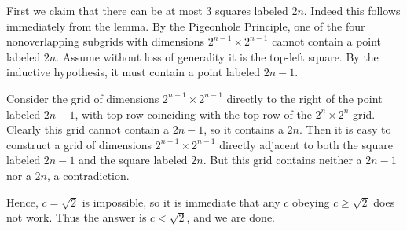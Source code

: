 First we claim that there can be at most $3$ squares labeled $2n$. Indeed this follows immediately from the lemma. By the Pigeonhole Principle, one of the four nonoverlapping subgrids with dimensions $2^{n-1}\times2^{n-1}$ cannot contain a point labeled $2n$. Assume without loss of generality it is the top-left square. By the inductive hypothesis, it must contain a point labeled $2n-1$.

Consider the grid of dimensions $2^{n-1}\times2^{n-1}$ directly to the right of the point labeled $2n-1$, with top row coinciding with the top row of the $2^n\times2^n$ grid. Clearly this grid cannot contain a $2n-1$, so it contains a $2n$. Then it is easy to construct a grid of dimensions $2^{n-1}\times2^{n-1}$ directly adjacent to both the square labeled $2n-1$ and the square labeled $2n$. But this grid contains neither a $2n-1$ nor a $2n$, a contradiction.

Hence, $c=\sqrt2$ is impossible, so it is immediate that any $c$ obeying $c\ge\sqrt2$ does not work. Thus the answer is $c<\sqrt2$, and we are done.
